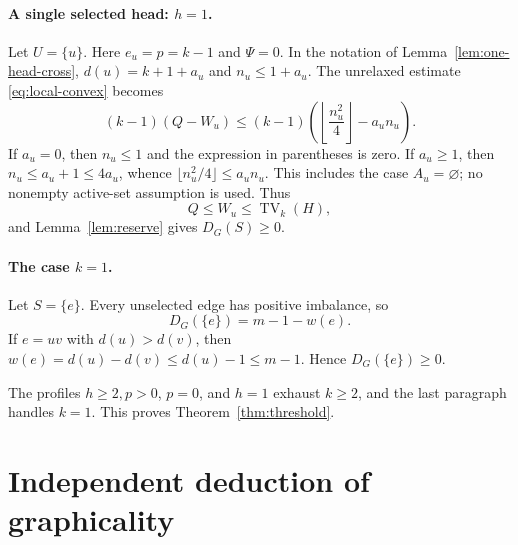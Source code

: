 \documentclass[a4paper,11pt]{amsart}
\numberwithin{equation}{section}
\theoremstyle{definition}
\theoremstyle{remark}
\newcommand{\TV}{\operatorname{TV}}
\begin{document}
\paragraph{A single selected head: $h=1$.}
Let $U=\{u\}$.  Here $e_u=p=k-1$ and $\Psi=0$.  In the notation of Lemma~\ref{lem:one-head-cross}, $d(u)=k+1+a_u$ and $n_u\le1+a_u$.  The unrelaxed estimate \eqref{eq:local-convex} becomes
\[
(k-1)(Q-W_u)
\le(k-1)\left(\left\lfloor\frac{n_u^2}{4}\right\rfloor-a_un_u\right).
\]
If $a_u=0$, then $n_u\le1$ and the expression in parentheses is zero.  If $a_u\ge1$, then $n_u\le a_u+1\le4a_u$, whence $\lfloor n_u^2/4\rfloor\le a_un_u$.  This includes the case $A_u=\varnothing$; no nonempty active-set assumption is used.  Thus
\begin{equation}
Q\le W_u\le\TV_k(H),
\label{eq:h-one-payment}
\end{equation}
and Lemma~\ref{lem:reserve} gives $D_G(S)\ge0$.

\paragraph{The case $k=1$.}
Let $S=\{e\}$.  Every unselected edge has positive imbalance, so
\[
D_G(\{e\})=m-1-w(e).
\]
If $e=uv$ with $d(u)>d(v)$, then $w(e)=d(u)-d(v)\le d(u)-1\le m-1$.  Hence $D_G(\{e\})\ge0$.

The profiles $h\ge2,p>0$, $p=0$, and $h=1$ exhaust $k\ge2$, and the last paragraph handles $k=1$.  This proves Theorem~\ref{thm:threshold}.

\section{Independent deduction of graphicality}\label{sec:deduction}
\end{document}
